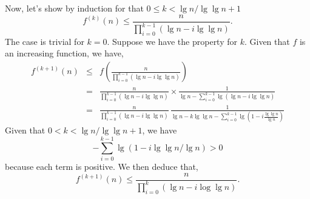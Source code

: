 \documentclass[a4paper,12pt]{article}
\begin{document}
\medskip
Now, let's show by induction for that $0 \le k < \lg n/\lg \lg n + 1$
\[ f^{(k)}(n) \le \frac{n}{\prod_{i=0}^{k-1}(\lg n - i \lg \lg n)}.\]
The case is trivial for $k=0$.  Suppose we have the property for $k$.
Given that $f$ is an increasing function, we have,
\begin{eqnarray*}
f^{(k+1)}(n) &\le& f\left(\frac{n}
{\prod_{i=0}^{k-1}(\lg n - i \lg \lg n)}\right) \\
&=& \frac{n}{\prod_{i=0}^{k-1}(\lg n - i \lg \lg n)} \times
\frac{1}{\lg n - \sum_{i=0}^{k-1}\lg (\lg n - i \lg \lg n)} \\
&=& \frac{n}{\prod_{i=0}^{k-1}(\lg n - i \lg \lg n)}\,
\frac{1}{\lg n - k \lg \lg n - 
\sum_{i=0}^{k-1}\lg \left(1 - i \frac{\lg \lg n}{\lg n}\right)}
\end{eqnarray*}
Given that $0 < k < \lg n / \lg \lg n + 1$, we have
\[ - \sum_{i=0}^{k-1}\lg(1 - i \lg \lg n/\lg n) > 0\]
because each term is positive.
We then deduce that,
\[ f^{(k+1)}(n) \le \frac{n}{\prod_{i=0}^{k}(\lg n - i \log \lg n)}.\]
\end{document}
